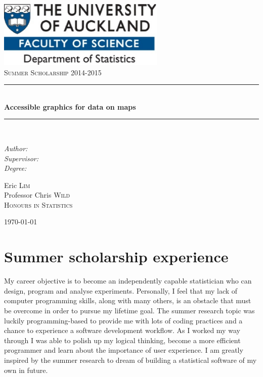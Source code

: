 \documentclass[a4paper, 12pt]{article}
\newcommand{\HRule}{\rule{\linewidth}{0.5mm}}
\begin{document}
\begin{titlepage}
	\begin{center}
	\includegraphics[trim = 0mm 0mm 0.2mm 0mm, clip, width=0.6\textwidth]{./uoa-logo}\\[2cm]
	\textsc{\Large Summer Scholarship 2014-2015}\\[0.5cm]
	
	\HRule \\[0.4cm]
	{ \LARGE \bfseries Accessible graphics for data on maps \\[0.4cm] }
	\HRule \\[1.5cm]
	
	\noindent
	\begin{multicols}{2}
		\begin{center}
			\begin{flushleft} \large
		    \emph{Author:} \\
		    \emph{Supervisor:} \\
		    \emph{Degree:} \\
		    \end{flushleft}
		    \begin{flushleft} \large
		    Eric \textsc{Lim} \\
		    Professor Chris \textsc{Wild} \\
		    \textsc{Honours in Statistics}
		    \end{flushleft}
	  \end{center}
	\end{multicols}
	
	\vfill
	
	{\large \today}
	
	\end{center}
\end{titlepage}

\section*{Summer scholarship experience}
My career objective is to become an independently capable statistician who can design, program and analyse experiments. Personally, I feel that my lack of computer programming skills, along with many others, is an obstacle that must be overcome in order to pursue my lifetime goal. The summer research topic was luckily programming-based to provide me with lots of coding practices and a chance to experience a software development workflow. As I worked my way through I was able to polish up my logical thinking, become a more efficient programmer and learn about the importance of user experience. I am greatly inspired by the summer research to dream of building a statistical software of my own in future.
\end{document}

